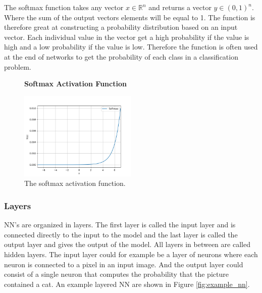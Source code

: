 The softmax function takes any vector $x \in \mathbb{R}^n$ and returns a
vector $y \in (0, 1)^n$. Where the sum of the output vectors elements will
be equal to 1. The function is therefore great at constructing a probability
distribution based on an input vector. Each individual value in the vector get
a high probability if the value is high and a low probability if the value is
low. Therefore the function is often used at the end of networks to get the
probability of each class in a classification problem.

\begin{figure}
    \centering
    \textbf{Softmax Activation Function}\par\medskip
    \includegraphics[width=0.5\textwidth]{./pictures/method/softmax_function.png}
    \caption{The softmax activation function.}
    \label{fig:softmax_activation}
\end{figure}


\subsubsection{Layers} \label{subsubsec:layers}

\gls{NN}'s are organized in layers. The first layer is called the input layer
and is connected directly to the input to the model and the last layer is called
the output layer and gives the output of the model. All layers in between are
called hidden layers. The input layer could for example be a layer of neurons
where each neuron is connected to a pixel in an input image. And the output
layer could consist of a single neuron that computes the probability that
the picture contained a cat. An example layered \gls{NN} are shown in Figure
\ref{fig:example_nn}.

